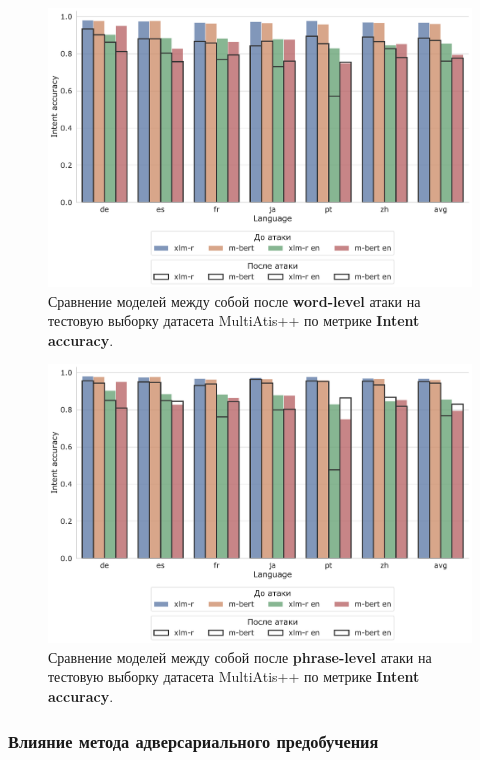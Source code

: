 \begin{figure}[h!]
    \centering
    \includegraphics[width=\textwidth]{images/3}
    \caption{Сравнение моделей между собой после \textbf{word-level} атаки на тестовую выборку датасета MultiAtis++ по метрике \textbf{Intent accuracy}.}\label{fig:figure3}
\end{figure}

\begin{figure}[h!]
    \centering
    \includegraphics[width=\textwidth]{images/6}
    \caption{Сравнение моделей между собой после \textbf{phrase-level} атаки на тестовую выборку датасета MultiAtis++ по метрике \textbf{Intent accuracy}.}\label{fig:figure6}
\end{figure}


\subsubsection{Влияние метода адверсариального предобучения}

